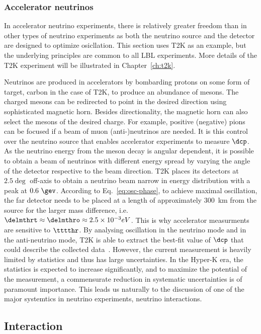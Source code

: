\subsubsection{Accelerator neutrinos}
  In accelerator neutrino experiments, there is relatively greater freedom than in other types of neutrino experiments as both the neutrino source and the detector are designed to optimize osicllation.
  This section uses T2K as an example, but the underlying principles are common to all LBL experiments.
  More details of the T2K experiment will be illustrated in Chapter~\ref{ch:t2k}.

  Neutrinos are produced in accelerators by bombarding protons on some form of target, carbon in the case of T2K, to produce an abundance of mesons.
  The charged mesons can be redirected to point in the desired direction using sophisticated magnetic horn.
  Besides directionality, the magnetic horn can also select the mesons of the desired charge.
  For example, positive (negative) pions can be focused if a beam of muon (anti-)neutrinos are needed.
  It is this control over the neutrino source that enables accelerator experiments to measure $\dcp$.
  As the neutrino energy from the meson decay is angular dependent, it is possible to obtain a beam of neutrinos with different energy spread by varying the angle of the detector respective to the beam direction. 
  T2K places its detectors at $2.5\deg$ off-axis to obtain a neutrino beam narrow in energy distribution with a peak at $0.6~\gev$.
  According to Eq.~\ref{eq:osc-phase}, to achieve maximal oscillation, the far detector needs to be placed at a length of approximately $300$~km from the source for the larger mass difference, i.e. $\delmthrt\approx\delmthro\approx2.5\times10^{-3}eV$.
  This is why accelerator measurments are sensitive to $\tttthr$.
  By analysing oscillation in the neutrino mode and in the anti-neutrino mode, T2K is able to extract the best-fit value of $\dcp$ that could describe the collected data~\cite{T2K:2019bcf}.
  However, the current measurement is heavily limited by statistics and thus has large uncertainties.
  In the Hyper-K era, the statistics is expected to increase significantly, and to maximize the potential of the measurement, a commensurate reduction in systematic uncertainties is of paramount importance.
  This leads us naturally to the discussion of one of the major systemtics in neutrino experiments, neutrino interactions.

\subsection{Interaction}
\label{subsec:interaction}

